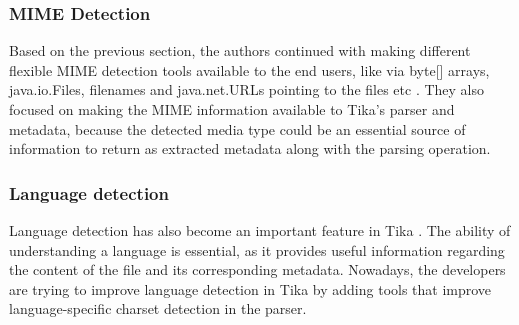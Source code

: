\documentclass{article}
\begin{document}
\subsubsection{MIME Detection}
Based on the previous section, the authors continued with making different flexible MIME detection tools available to the end users, like via byte[] arrays, java.io.Files, filenames and java.net.URLs pointing to the files etc \citep{tika_in_action}. They  also focused on making the MIME information available to Tika’s parser and metadata, because the detected media type could be an essential source of information to return as extracted metadata along with the parsing operation.

\subsubsection{Language detection}
Language detection has also become an important feature in Tika \citep{tika_in_action}. The ability of understanding a language is essential, as it provides useful information regarding the content of the file and its corresponding metadata. Nowadays, the developers are trying to improve language detection in Tika by adding tools that improve language-specific charset detection in the parser.
\end{document}
